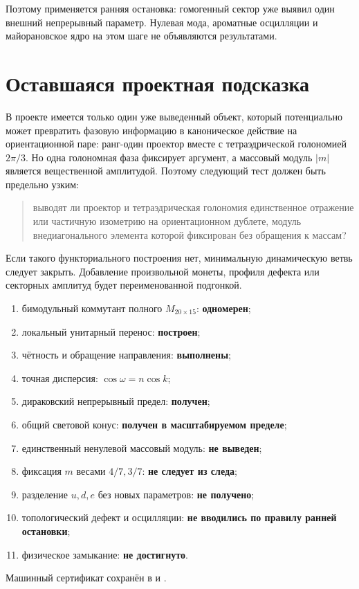 Поэтому применяется ранняя остановка: гомогенный сектор уже выявил один
внешний непрерывный параметр. Нулевая мода, ароматные осцилляции и
майорановское ядро на этом шаге не объявляются результатами.

\section{Оставшаяся проектная подсказка}

В проекте имеется только один уже выведенный объект, который потенциально
может превратить фазовую информацию в каноническое действие на
ориентационной паре: ранг-один проектор вместе с тетраэдрической
голономией $2\pi/3$. Но одна голономная фаза фиксирует аргумент, а массовый
модуль $|m|$ является вещественной амплитудой. Поэтому следующий тест должен
быть предельно узким:

\begin{quote}
выводят ли проектор и тетраэдрическая голономия единственное отражение или
частичную изометрию на ориентационном дублете, модуль внедиагонального
элемента которой фиксирован без обращения к массам?
\end{quote}

Если такого функториального построения нет, минимальную динамическую ветвь
следует закрыть. Добавление произвольной монеты, профиля дефекта или
секторных амплитуд будет переименованной подгонкой.

\begin{protocol}
\begin{enumerate}
 \item бимодульный коммутант полного $M_{20\times15}$:
 \textbf{одномерен};
 \item локальный унитарный перенос:
 \textbf{построен};
 \item чётность и обращение направления:
 \textbf{выполнены};
 \item точная дисперсия:
 \textbf{$\cos\omega=n\cos k$};
 \item дираковский непрерывный предел:
 \textbf{получен};
 \item общий световой конус:
 \textbf{получен в масштабируемом пределе};
 \item единственный ненулевой массовый модуль:
 \textbf{не выведен};
 \item фиксация $m$ весами $4/7,3/7$:
 \textbf{не следует из следа};
 \item разделение $u,d,e$ без новых параметров:
 \textbf{не получено};
 \item топологический дефект и осцилляции:
 \textbf{не вводились по правилу ранней остановки};
 \item физическое замыкание:
 \textbf{не достигнуто}.
\end{enumerate}
\end{protocol}

Машинный сертификат сохранён в
 и
.
